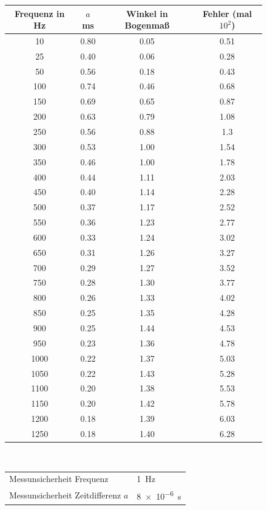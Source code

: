 \begin{figure}[h!]
	\centering
	\begin{tabular}{c|c|c|c}
	Frequenz in \si{\hertz}&  $a$ \si{\milli\second} & Winkel in Bogenmaß& Fehler (mal $10^2$)\\
		\hline
		10 & 0.80  & 0.05 & 0.51 \\
		25 & 0.40  & 0.06 & 0.28 \\
		50 & 0.56 & 0.18 & 0.43 \\
		100 & 0.74 & 0.46 & 0.68 \\
		150 & 0.69 & 0.65 & 0.87 \\
		200 & 0.63 & 0.79 & 1.08 \\
		250 & 0.56 & 0.88 & 1.3  \\
		300 & 0.53 & 1.00    & 1.54 \\
		350 & 0.46 & 1.00    & 1.78 \\
		400 & 0.44 & 1.11 & 2.03 \\
		450 & 0.40 & 1.14 & 2.28 \\
		500 & 0.37 & 1.17 & 2.52 \\
		550 & 0.36 & 1.23 & 2.77 \\
		600 & 0.33 & 1.24 & 3.02 \\
		650 & 0.31 & 1.26 & 3.27 \\
		700 & 0.29 & 1.27 & 3.52 \\
		750 & 0.28 & 1.30  & 3.77 \\
		800 & 0.26 & 1.33 & 4.02 \\
		850 & 0.25 & 1.35 & 4.28 \\
		900 & 0.25 & 1.44 & 4.53 \\
		950 & 0.23 & 1.36 & 4.78 \\
		1000 & 0.22 & 1.37 & 5.03 \\
		1050 & 0.22 & 1.43 & 5.28 \\
		1100 & 0.20  & 1.38 & 5.53 \\
		1150 & 0.20  & 1.42 & 5.78 \\
		1200 & 0.18 & 1.39 & 6.03 \\
		1250 & 0.18 & 1.40  & 6.28 \\
		\end{tabular}
	\label{tab:phasenverschub}
	\\
	\vspace{1cm}
	\begin{tabular}{ll}
		Messunsicherheit Frequenz & \SI{1}{\hertz} \\
		Messunsicherheit Zeitdifferenz $a$ & \SI{8e-6}{\second}
	\end{tabular}	
\end{figure}

